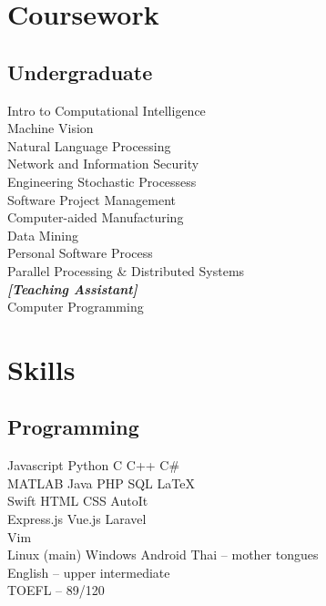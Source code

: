 \documentclass[]{deedy-resume-openfont}
\begin{document}
\begin{minipage}[t]{0.33\textwidth}

\section{Coursework}
\subsection{Undergraduate}
Intro to Computational Intelligence \\
Machine Vision \\
Natural Language Processing \\
Network and Information Security \\
Engineering Stochastic Processess \\
Software Project Management \\
Computer-aided Manufacturing \\
Data Mining \\
Personal Software Process \\
Parallel Processing \& Distributed Systems \\
{\footnotesize \textit{\textbf{[Teaching Assistant]}}} \\
Computer Programming \\


\section{Skills}
\subsection{Programming}
Javascript \textbullet{} Python \textbullet{} C \textbullet{} C++ \textbullet{} C\# \\
MATLAB \textbullet{} Java \textbullet{} PHP \textbullet{} SQL \textbullet{} \LaTeX\ \\
Swift \textbullet{} HTML \textbullet{} CSS \textbullet{} AutoIt \\ 
Express.js \textbullet{} Vue.js \textbullet{} Laravel \\
Vim \\
Linux (main) \textbullet{} Windows \textbullet{} Android
Thai – mother tongues \\
English – upper intermediate \\
TOEFL – 89/120
\sectionsep

%
%

\end{minipage} 
\end{document}

